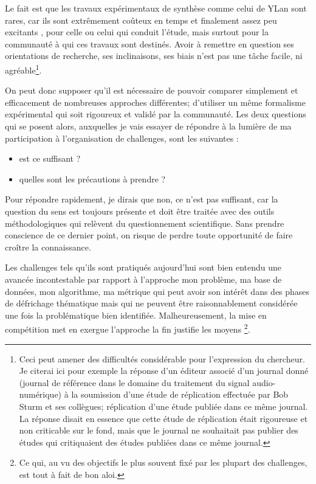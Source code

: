 Le fait est que les travaux expérimentaux de synthèse comme celui de YLan sont rares, car ils sont extrêmement coûteux en temps et finalement assez peu \fg excitants \og, pour celle ou celui qui conduit l'étude, mais surtout pour la communauté à qui ces travaux sont destinés. Avoir à remettre en question ses orientations de recherche, ses inclinaisons, ses biais n'est pas une tâche facile, ni agréable\footnote{Ceci peut amener des difficultés considérable pour l'expression du chercheur. Je citerai ici pour exemple la réponse d'un éditeur associé d'un journal donné (journal de référence dans le domaine du traitement du signal audio-numérique) à la soumission d'une étude de réplication effectuée par Bob Sturm et ses collègues; réplication d'une étude publiée dans ce même journal. La réponse disait en essence que cette étude de réplication était rigoureuse et non criticable sur le fond, mais que le journal ne souhaitait pas publier des études qui critiquaient des études publiées dans ce même journal.}.

On peut donc supposer qu'il est nécessaire de pouvoir comparer simplement et efficacement de nombreuses approches différentes; d'utiliser un même formalisme expérimental qui soit rigoureux et validé par la communauté. Les deux questions qui se posent alors, auxquelles je vais essayer de répondre à la lumière de ma participation à l'organisation de challenges, sont les suivantes :
\begin{itemize}
  \item est ce suffisant ?
  \item quelles sont les précautions à prendre ?
\end{itemize}

Pour répondre rapidement, je dirais que non, ce n'est pas suffisant, car la question du sens est toujours présente et doit être traitée avec des outils méthodologiques qui relèvent du questionnement scientifique. Sans prendre conscience de ce dernier point, on risque de perdre toute opportunité de faire croître la connaissance.

Les challenges tels qu'ils sont pratiqués aujourd'hui sont bien entendu une avancée incontestable par rapport à l'approche \fg mon problème, ma base de données, mon algorithme, ma métrique \og qui peut avoir son intérêt dans des phases de défrichage thématique mais qui ne peuvent être raisonnablement considérée une fois la problématique bien identifiée. Malheureusement, la mise en compétition met en exergue l'approche \og la fin justifie les moyens \fg \footnote{Ce qui, au vu des objectifs le plus souvent fixé par les plupart des challenges, est tout à fait de bon aloi.}.

